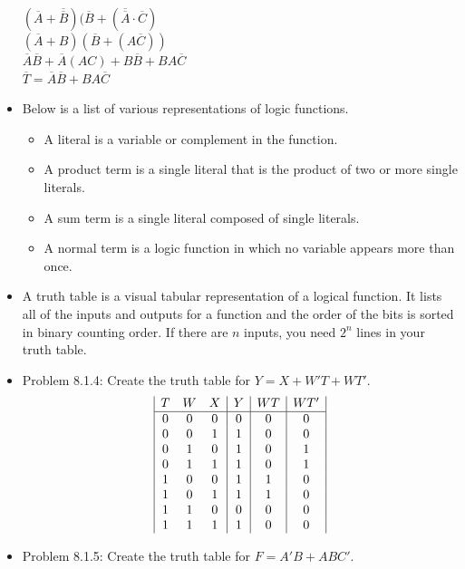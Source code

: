 \documentclass[10pt,a4paper]{article}
\newcommand{\answer}[1]{\boxed{\text{Answer: #1}}}
\begin{document}
\begin{itemize}
$(\overline{A}+\overline{\overline{B}})(\overline{B}+(\overline{\overline{A}}\cdot\overline{C})$\\
$(\overline{A}+B)(\overline{B}+(A\overline{C}))$\\
$\overline{A}\overline{B}+\overline{A}(AC)+B\overline{B}+BA\overline{C}$\\
$\overline{T}=\overline{A}\overline{B}+BA\overline{C}$\\
\answer{$\overline{T}=\overline{A}\overline{B}+BA\overline{C}$}
\item Below is a list of various representations of logic functions.
\begin{itemize}
\item A literal is a variable or complement in the function.
\item A product term is a single literal that is the product of two or more single literals.
\item A sum term is a single literal composed of single literals.
\item A normal term is a logic function in which no variable appears more than once. 
\end{itemize}
\item A truth table is a visual tabular representation of a logical function. It lists all of the inputs and outputs for a function and the order of the bits is sorted in binary counting order. If there are $n$ inputs, you need $2^n$ lines in your truth table. 
\item Problem 8.1.4: Create the truth table for $Y=X+W'T+WT'$.\\
\begin{displaymath}
\begin{array}{|c c c|c|c|c|}
T & W & X & Y & WT & WT'\\ 
\hline 
0 & 0 & 0 & 0 & 0 & 0\\
0 & 0 & 1 & 1 & 0 & 0\\
0 & 1 & 0 & 1 & 0 & 1\\
0 & 1 & 1 & 1 & 0 & 1\\
1 & 0 & 0 & 1 & 1 & 0\\
1 & 0 & 1 & 1 & 1 & 0\\
1 & 1 & 0 & 0 & 0 & 0\\
1 & 1 & 1 & 1 & 0 & 0\\
\end{array}
\end{displaymath}
\item Problem 8.1.5: Create the truth table for $F=A'B+ABC'$. 
\begin{displaymath}

\end{displaymath}
\end{itemize}
\end{document}
